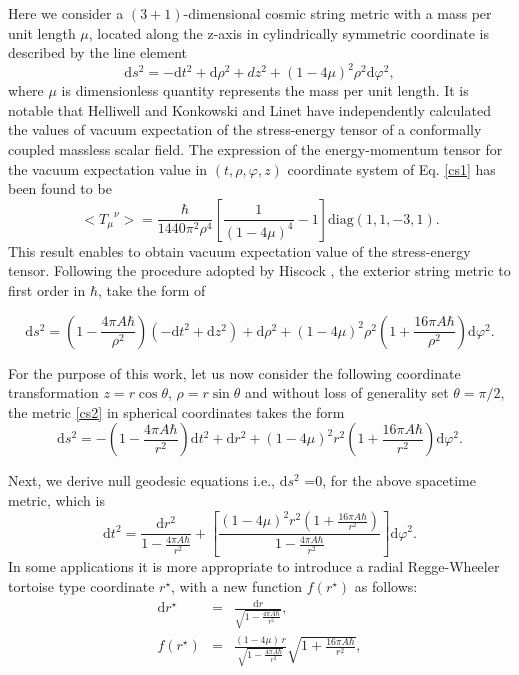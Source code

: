 \documentclass[preprint,superscriptaddress,amsfonts,amssymb,amsmath,showpacs]{revtex4}
\begin{document}
Here we consider a $(3 + 1)$-dimensional cosmic string metric with a mass per unit length $\mu$, located along the z-axis in cylindrically symmetric coordinate is described by the line element
\begin{equation}\label{cs1}
\mathrm{d}s^2= -\mathrm{d}t^2+\mathrm{d}\rho^2+dz^2+\left(1-4\mu\right)^2\rho^2 \mathrm{d}\varphi^2,
\end{equation}
where $\mu$ is dimensionless quantity represents the mass per unit length.
It is notable that Helliwell and Konkowski \cite{Helliwell} and Linet \cite{Linet} have independently calculated
the values of vacuum expectation of the stress-energy tensor of a conformally coupled massless scalar field. The expression of the energy-momentum tensor for the vacuum expectation value in 
$\left(t, \rho, \varphi, z\right)$ coordinate system of Eq. \eqref{cs1} has been found to be 
\begin{equation}
<{T_{\mu}}^{\nu}> = \frac{\hbar}{ 1440 \pi^2 \rho^4}\left[\frac{1}{(1-4\mu)^4}-1\right]  \text{diag}(1, 1, -3, 1).
\end{equation}
This result enables to obtain vacuum expectation value of the stress-energy tensor. Following the procedure adopted by Hiscock \cite{Hiscock1}, the exterior string metric to first order in $\hbar$, take the form of
\begin{widetext}
\begin{equation}\label{cs2}
\mathrm{d}s^2=\left(1-\frac{4 \pi A \hbar }{\rho^2}\right)\left(-\mathrm{d}t^2+\mathrm{d}z^2\right)+\mathrm{d}\rho^2+\left(1-4\mu\right)^2 \rho^2 \left(1+\frac{16 \pi A \hbar}{\rho^2}\right)\mathrm{d}\varphi^2.
\end{equation}
\end{widetext}
For the purpose of this work, let us now consider the following coordinate transformation $z = r \cos\theta$, $\rho = r \sin\theta $
and without loss of generality set $\theta=\pi/2$, the metric \eqref{cs2} in spherical coordinates takes the form
\begin{equation}\label{metric1}
\mathrm{d}s^2=-\left(1-\frac{4 \pi A \hbar }{r^2}\right)\mathrm{d}t^2+\mathrm{d}r^2+(1-4\mu)^2 r^2 \left(1+\frac{16 \pi A \hbar}{r^2}\right)\mathrm{d}\varphi^2.
\end{equation}

Next, we derive null geodesic equations i.e., $\mathrm{d}s^2$ =0, for the above spacetime metric, which is 
\begin{equation}\label{dt}
\mathrm{d}t^2=\frac{\mathrm{d}r^2}{1-\frac{4 \pi A \hbar }{r^2}}+\left[\frac{(1-4 \mu)^2 r^2 \left(1+\frac{16 \pi A \hbar}{r^2}\right) }{1-\frac{4 \pi A \hbar }{r^2}}\right]\mathrm{d}\varphi^2.
\end{equation}
In some applications it is more appropriate to introduce a radial Regge-Wheeler tortoise type coordinate $r^\star$, with a new function  $f(r^\star)$ as follows:
\begin{eqnarray}\label{r}
\mathrm{d}r^\star &=&\frac{\mathrm{d}r}{\sqrt{1-\frac{4 \pi A \hbar }{r^2}}}, \\ \label{f}
f(r^\star)&=& \frac{(1-4\mu) \,r }{\sqrt{1-\frac{4 \pi A \hbar }{r^2}}}\sqrt{1+\frac{16 \pi A \hbar}{r^2}},
\end{eqnarray}
\end{document}
